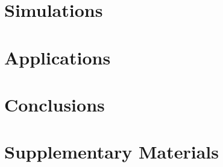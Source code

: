 \documentclass[letter,12pt]{article}
\begin{document}
\section{Simulations}\label{sec:simulations}
\section{Applications}\label{sec:applications}
\section{Conclusions}\label{sec:conclusions}
\section{Supplementary Materials}\label{sec:suppmat}

 
\end{document}

